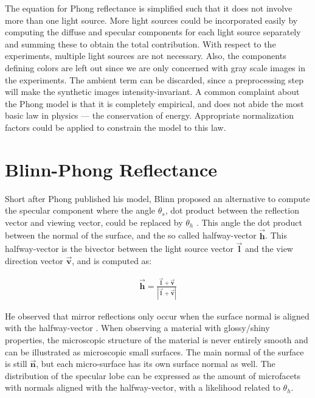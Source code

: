 
The equation for Phong reflectance is simplified such that it does not involve more than one light source. More light sources could be incorporated easily by computing the diffuse and specular components for each light source separately and summing these to obtain the total contribution. With respect to the experiments, multiple light sources are not necessary. Also, the components defining colors are left out since we are only concerned with gray scale images in the experiments. The ambient term can be discarded, since a preprocessing step will make the synthetic images intensity-invariant. A common complaint about the Phong model is that it is completely empirical, and does not abide the most basic law in physics --- the conservation of energy. Appropriate normalization factors could be applied to constrain the model to this law.

	\section{Blinn-Phong Reflectance}\label{sec:BlinnPhong}
		Short after Phong published his model, Blinn proposed an alternative to compute the specular component where the angle $\theta_s$, dot product between the reflection vector and viewing vector, could be replaced by $\theta_h$ \cite{Blinn}. This angle the dot product between the normal of the surface, and the so called halfway-vector $\vec{\mathbf{h}}$. This halfway-vector is the bivector between the light source vector $\vec{\mathbf{l}}$ and the view direction vector $\vec{\mathbf{v}}$, and is computed as:

	\begin{eqnarray*}
		\vec{\mathbf{h}} = \frac{\vec{\mathbf{l}} + \vec{\mathbf{v}}}{|\vec{\mathbf{l}} + \vec{\mathbf{v}}|}
	\end{eqnarray*}

He observed that mirror reflections only occur when the surface normal is aligned with the halfway-vector \cite{DigitalModeling}. When observing a material with glossy/shiny properties, the microscopic structure of the material is never entirely smooth and can be illustrated as microscopic small surfaces. The main normal of the surface is still $\vec{\mathbf{n}}$, but each micro-surface has its own surface normal as well. The distribution of the specular lobe can be expressed as the amount of microfacets with normals aligned with the halfway-vector, with a likelihood related to $\theta_h$.


